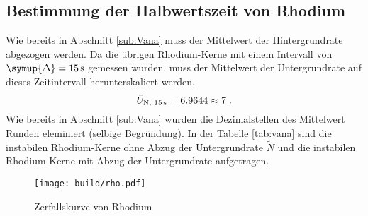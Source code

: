\subsection{Bestimmung der Halbwertszeit von Rhodium}
Wie bereits in Abschnitt \ref{sub:Vana} muss der Mittelwert der Hintergrundrate abgezogen werden.
Da die übrigen Rhodium-Kerne mit einem Intervall von $\symup{\Delta} = \SI{15}{\second}$ gemessen wurden, muss der Mittelwert der Untergrundrate
auf dieses Zeitintervall herunterskaliert werden.
\begin{equation*}
    \bar{U}_\text{N, \SI{15}{\second}} = 6.9644 \approx 7 \; \text{.}
\end{equation*}
Wie bereits in Abschnitt \ref{sub:Vana} wurden die  Dezimalstellen des Mittelwert Runden eleminiert (selbige Begründung).
In der Tabelle \ref{tab:vana} sind die instabilen Rhodium-Kerne ohne Abzug der Untergrundrate $\tilde{N}$ und die instabilen Rhodium-Kerne mit Abzug 
der Untergrundrate aufgetragen.
\begin{figure}
    \centering
    \caption{Zerfallskurve von Rhodium}
    \label{fig:rho}
    \texttt{[image: build/rho.pdf]}
\end{figure}